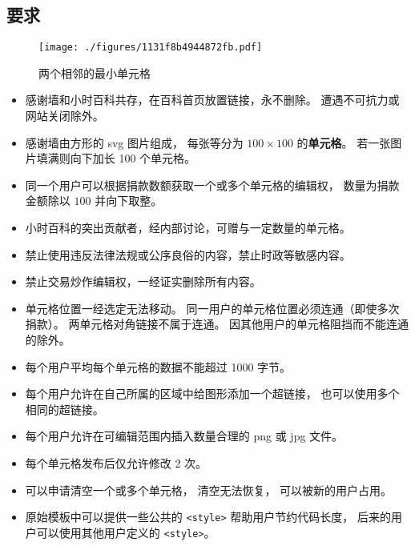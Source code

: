 
\begin{issues}
\issueDraft
{}
\end{issues}

\subsection{要求}

\begin{figure}[ht]
\centering
\texttt{[image: ./figures/1131f8b4944872fb.pdf]}
\caption{两个相邻的最小单元格} \label{fig_thanks_1}
\end{figure}

\begin{itemize}
\item 感谢墙和小时百科共存，在百科首页放置链接，永不删除。 遭遇不可抗力或网站关闭除外。
\item 感谢墙由方形的 svg 图片组成， 每张等分为 $100\times 100$ 的\textbf{单元格}。 若一张图片填满则向下加长 100 个单元格。
\item 同一个用户可以根据捐款数额获取一个或多个单元格的编辑权， 数量为捐款金额除以 $100$ 并向下取整。
\item 小时百科的突出贡献者，经内部讨论，可赠与一定数量的单元格。
\item 禁止使用违反法律法规或公序良俗的内容，禁止时政等敏感内容。
\item 禁止交易炒作编辑权，一经证实删除所有内容。
\item 单元格位置一经选定无法移动。 同一用户的单元格位置必须连通（即使多次捐款）。 两单元格对角链接不属于连通。 因其他用户的单元格阻挡而不能连通的除外。
\item 每个用户平均每个单元格的数据不能超过 1000 字节。
\item 每个用户允许在自己所属的区域中给图形添加一个超链接， 也可以使用多个相同的超链接。
\item 每个用户允许在可编辑范围内插入数量合理的 png 或 jpg 文件。
\item 每个单元格发布后仅允许修改 2 次。
\item 可以申请清空一个或多个单元格， 清空无法恢复， 可以被新的用户占用。
\item 原始模板中可以提供一些公共的 \verb`<style>` 帮助用户节约代码长度， 后来的用户可以使用其他用户定义的 \verb`<style>`。
\end{itemize}

